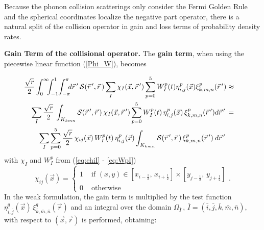 \documentclass[11pt]{article}
\newcommand{\ot}{\frac{1}{2}}
\newcommand{\ib}{\bar{i}} %
\newcommand{\jb}{\bar{j}} %
\newcommand{\kb}{\bar{k}} %
\newcommand{\mb}{\bar{m}} %
\newcommand{\nb}{\bar{n}} %
\begin{document}
Because the phonon collision scatterings 
only consider the Fermi Golden Rule \cite{book:Lundstrom} 
and the spherical coordinates localize the negative part operator,
there is a natural split of the collision operator in gain and loss terms of probability density rates.  

\smallskip 

{\bf Gain Term of the collisional operator.} The {\bf gain term}, when
using the piecewise linear function (\ref{Phi_W}), becomes

%
{\small
\begin{eqnarray*}
\frac{\sqrt{r}}{2} %
\int_{0}^{\infty} \hspace{-5pt}  \int_{-1}^{1} \hspace{-2pt}
\int_{-\pi}^{\pi} \hspace{-5pt} d\vec{r} \, ' \,
{\cal S}(\vec{r}\,',\vec{r}\,)  
\sum_{I} \chi_{I}(\vec{x} , \vec{r}\, ' )
\sum_{p=0}^{5} W_{I}^p (t) \eta^{p}_{i,j}(\vec{x}) \xi^{p}_{k,m,n}(\vec{r}\,')  
& \approx &
\\
\sum_{I}  \frac{\sqrt{r}}{2} \, \int_{K_{k m n}}
{\cal S}(\vec{r}\,',\vec{r}\,) %
\, \chi_{I}(\vec{x},\vec{r}\,')
\sum_{p=0}^{5} W_{I}^p (t) \, \eta^{p}_{i,j}(\vec{x}) \, \xi^{p}_{k,m,n}(\vec{r}\,') %
d\vec{r} \, ' \,
& = &
\\
\sum_{I} \sum_{p=0}^{5}  \frac{\sqrt{r}}{2} \,
\chi_{ij}(\vec{x}) \, W_{I}^p (t) \, \eta^{p}_{i,j}(\vec{x})
\int_{K_{k m n}}
{\cal S}(\vec{r}\,',\vec{r}\,) \, \xi^{p}_{k,m,n}(\vec{r}\,')
\: d\vec{r} \, ' \,
&&
\end{eqnarray*}
}
%
with $\chi_I$ and $W^p_I$ from (\ref{eq:chiI} - \ref{eq:WpI})
$$
\chi_{ij}(\vec{x}) = \left\lbrace 
\begin{array}{ll}
 1 & \mbox{ if } (x,y) \in \left[ x_{i - \ot} , \, x_{i + \ot} \right] \times
                  \left[ y_{j - \ot} , \, y_{j + \ot} \right] 
\\
0 & \mbox{ otherwise }
\end{array}
\right. .
$$
%
In the weak formulation, the gain term is multiplied by the test function
$\eta^{q}_{\ib,\jb}(\vec{x}) \, \xi^{q}_{\kb,\mb,\nb}(\vec{r})$
and an integral over the domain $ \Omega_{{\bar{I}}} \, , \, \bar{I}  = ( {\ib , \jb , \kb , \mb , \nb} ) ,$ with respect to $(\vec{x},\vec{r})$ is performed, obtaining:
\end{document}
